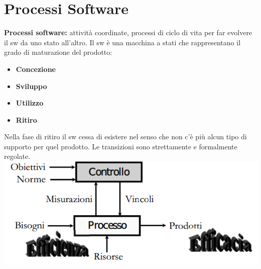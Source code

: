 


\section{Processi Software}
\textbf{Processi software:} attività coordinate, processi di ciclo di vita per far evolvere il sw da uno stato all'altro. Il sw è una macchina a stati che rappresentano il grado di maturazione del prodotto:

\begin{itemize}

	\item \textbf{Concezione}
	\item \textbf{Sviluppo}
	\item \textbf{Utilizzo}
	\item \textbf{Ritiro}

\end{itemize}

Nella fase di ritiro il sw cessa di esistere nel senso che non c'è più alcun tipo di supporto per quel prodotto. Le transizioni sono strettamente e formalmente regolate.	\\

\includegraphics[width=0.75\columnwidth]{img2} %
\\


